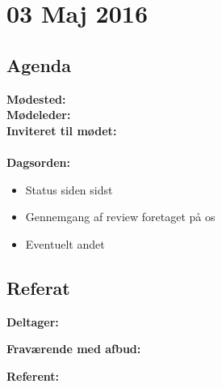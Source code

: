 \chapter*{03 Maj 2016}

\section*{Agenda}

\textbf{Mødested:}  \\
\textbf{Mødeleder:}  \\
\textbf{Inviteret til mødet:} \\\\
\textbf{Dagsorden:}\\

\begin{itemize}
	\item Status siden sidst
	\item Gennemgang af review foretaget på os
	\item Eventuelt andet
\end{itemize}

\section*{Referat}
\textbf{Deltager:} 

\textbf{Fraværende med afbud:} 

\textbf{Referent:} 





